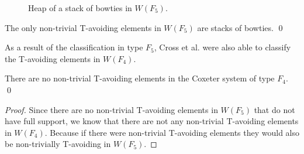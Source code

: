 \begin{figure*}[h!] \centering
{}
\caption{Heap of a stack of bowties in $W(F_5)$.}\label{fig:stackobowties}
\end{figure*}

\begin{proposition}
The only non-trivial T-avoiding elements in $W(F_5)$ are stacks of bowties. \qed	
\end{proposition}


As a result of the classification in type $F_5$, Cross et al. were also able to classify the T-avoiding elements in $W(F_4)$. 

\begin{corollary}
There are no non-trivial T-avoiding elements in the Coxeter system of type $F_4$. \qed	
\begin{proof}
	Since there are no non-trivial T-avoiding elements in $W(F_5)$ that do not have full support, we know that there are not any non-trivial T-avoiding elements in $W(F_4)$. Because if there were non-trivial T-avoiding elements they would also be non-trivially T-avoiding in $W(F_5)$.
\end{proof}
\end{corollary}

